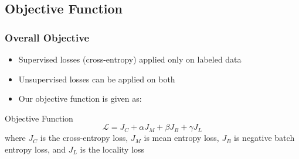 \subsection{Objective Function}
\begin{frame}
	\frametitle{Overall Objective}
	\begin{itemize}
		\item Supervised losses (cross-entropy) applied only on labeled data
		\item Unsupervised losses can be applied on both
		\item Our objective function is given as:
	\end{itemize}
	\begin{block}{Objective Function}
		\begin{equation*}
			\mathcal{L} = J_C + \alpha J_M + \beta J_B + \gamma J_L
		\end{equation*}
		where $J_C$ is the cross-entropy loss, $J_M$ is mean entropy loss, $J_B$ is negative batch
		entropy loss, and $J_L$ is the locality loss
	\end{block}
\end{frame}
